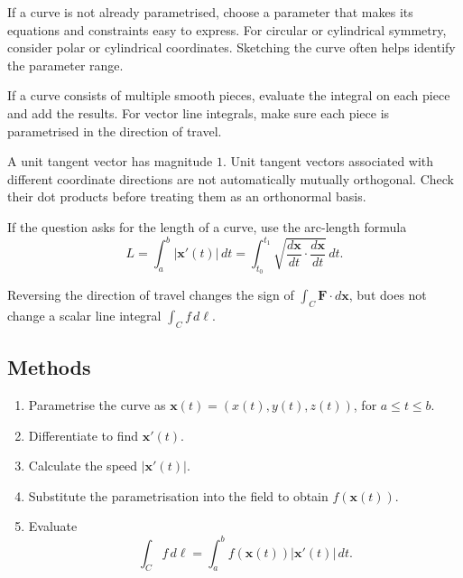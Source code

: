 \begin{mistake}
  If a curve is not already parametrised, choose a parameter that makes its equations and constraints easy to express. For circular or cylindrical symmetry, consider polar or cylindrical coordinates. Sketching the curve often helps identify the parameter range.
\end{mistake}

\begin{mistake}
  If a curve consists of multiple smooth pieces, evaluate the integral on each piece and add the results. For vector line integrals, make sure each piece is parametrised in the direction of travel.
\end{mistake}

\begin{mistake}
  A unit tangent vector has magnitude $1$. Unit tangent vectors associated with different coordinate directions are not automatically mutually orthogonal. Check their dot products before treating them as an orthonormal basis.
\end{mistake}

\begin{mistake}
  If the question asks for the length of a curve, use the arc-length formula
  \[
    L=\int_a^b |\mathbf{x}'(t)|\,dt = \int_{t_0}^{t_1} \sqrt{\frac{d\mathbf{x}}{dt} \cdot \frac{d \mathbf{x}}{dt} }\,dt. 
  \]
\end{mistake}

\begin{mistake}
  Reversing the direction of travel changes the sign of $\int_C\mathbf{F}\cdot d\mathbf{x}$, but does not change a scalar line integral $\int_C f\,d\ell$.
\end{mistake}

\subsection{Methods}

\begin{nmeth}
  \begin{enumerate} \emph{}
    \item Parametrise the curve as $\mathbf{x}(t)=(x(t),y(t),z(t))$, for $a\leq t\leq b$.
    \item Differentiate to find $\mathbf{x}'(t)$.
    \item Calculate the speed $|\mathbf{x}'(t)|$.
    \item Substitute the parametrisation into the field to obtain $f(\mathbf{x}(t))$.
    \item Evaluate
    \[
      \int_C f\,d\ell
      =\int_a^b f(\mathbf{x}(t))|\mathbf{x}'(t)|\,dt.
    \]
  \end{enumerate}
\end{nmeth}

